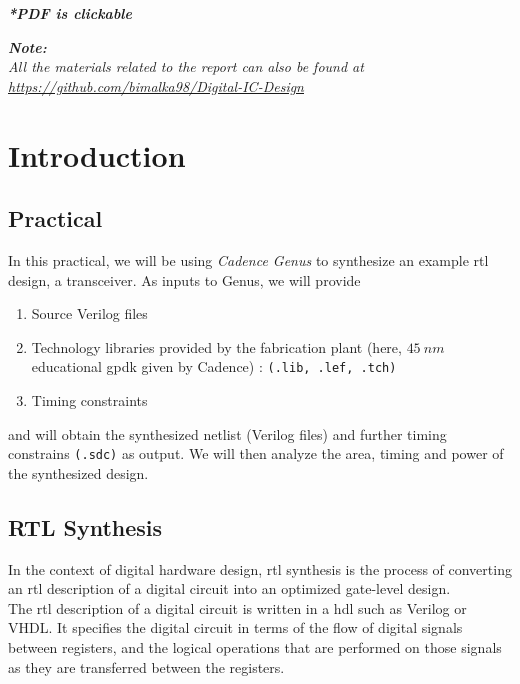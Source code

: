 \documentclass[a4paper,11pt]{article}%
\begin{document}


\pagebreak

\tableofcontents
\listoffigures
\listoftables

\vfill
\begin{center}
	\textbf{\textit{*PDF is clickable}}
\end{center}

\textit{\textbf{Note:}}\\
\textit{All the materials related to the report can also be found at \url{https://github.com/bimalka98/Digital-IC-Design}}
\pagebreak


\pagebreak
\section{Introduction}

\subsection{Practical}
In this practical, we will be using \textit{Cadence Genus} to synthesize an example \ac{rtl} design, a transceiver. As inputs to Genus, we will provide

\begin{enumerate}
	\item Source Verilog files
	\item Technology libraries provided by the fabrication plant (here, $45~nm$ educational \ac{gpdk} given by Cadence) : {\tt (.lib, .lef, .tch)}
	\item Timing constraints
\end{enumerate}

and will obtain the synthesized netlist (Verilog files) and further timing constrains {\tt (.sdc)} as output. We will then analyze the area, timing and power of the synthesized design.

\subsection{RTL Synthesis}

In the context of digital hardware design, \ac{rtl} synthesis is the process of converting an \ac{rtl} description of a digital circuit into an optimized gate-level design.\\

The \ac{rtl} description of a digital circuit is written in a \ac{hdl} such as Verilog or VHDL. It specifies the digital circuit in terms of the flow of digital signals between registers, and the logical operations that are performed on those signals as they are transferred between the registers.\\
\end{document}
